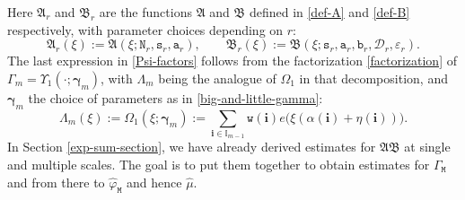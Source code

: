 \documentclass[12pt, twoside]{article}
\theoremstyle{definition}
\numberwithin{equation}{section}
\begin{document}
Here $\mathfrak A_r$ and $\mathfrak B_r$ are the functions $\mathfrak A$ and $\mathfrak B$ defined in \eqref{def-A} and \eqref{def-B} respectively, with parameter choices depending on $r$:
\begin{equation} \label{ArBr}  
\mathfrak A_r(\xi) := \mathfrak A(\xi; \mathtt N_r, \mathtt s_r, \mathtt a_r), \qquad \mathfrak B_r(\xi) := \mathfrak B(\xi; \mathtt s_r, \mathtt a_r, \mathtt b_r, \mathscr{D}_r, \varepsilon_r).
\end{equation}
The last expression in \eqref{Psi-factors} follows from the factorization \eqref{factorization} of $\Gamma_m = \Upsilon_1(\cdot; \pmb{\gamma}_m)$, with $\Lambda_m$ being the analogue of $\Omega_1$ in that decomposition, and $\pmb{\gamma}_m$ the choice of parameters as in \eqref{big-and-little-gamma}: 
\begin{equation} \Lambda_m(\xi) := \Omega_1(\xi; \pmb{\gamma}_m) := \sum_{\mathbf i \in \mathbb I_{m-1}} \mathtt w(\mathbf i) e \bigl(\xi (\alpha(\mathbf i) + \eta(\mathbf i)) \bigr). \label{def-Lambda} \end{equation}  
In Section \ref{exp-sum-section}, we have already derived estimates for $\mathfrak A \mathfrak B$ at single and multiple scales. The goal is to
put them together to obtain estimates for $\Gamma_{\mathtt M}$ and from there to $\widehat{\varphi}_{\mathtt M}$ and hence $\widehat{\mu}$. 
\end{document}
